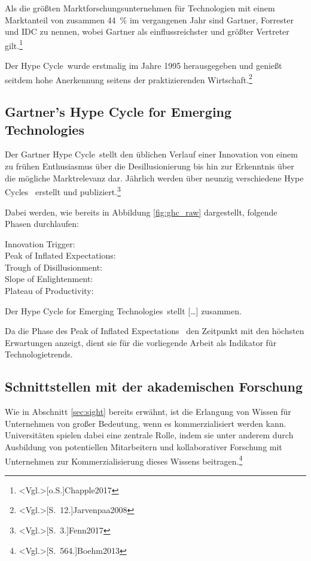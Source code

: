 Als die größten Marktforschungsunternehmen für Technologien mit einem Marktanteil von zusammen 44~\% im vergangenen Jahr sind Gartner, Forrester und IDC zu nennen, wobei Gartner als einflussreichster und größter Vertreter gilt.\footnote{\citeNP<Vgl.>[o.S.]{Chapple2017}}

Der \glqq Hype Cycle\grqq~wurde erstmalig im Jahre 1995 herausgegeben und genießt seitdem hohe Anerkennung seitens der praktizierenden Wirtschaft.\footnote{\citeNP<Vgl.>[S.~12.]{Jarvenpaa2008}}

\subsection{Gartner’s Hype Cycle for Emerging Technologies}
Der \glqq Gartner Hype Cycle\grqq~stellt den üblichen Verlauf einer Innovation von einem zu frühen Enthusiasmus über die Desillusionierung bis hin zur Erkenntnis über die mögliche Marktrelevanz dar. Jährlich werden über neunzig verschiedene \glqq Hype Cycles\grqq~ erstellt und publiziert.\footnote{\citeNP<Vgl.>[S.~3.]{Fenn2017}}

Dabei werden, wie bereits in Abbildung \ref{fig:ghc_raw} dargestellt, folgende Phasen durchlaufen:
\begin{description}
	\item[Innovation Trigger:] 
	\item[Peak of Inflated Expectations:] 
	\item[Trough of Disillusionment:] 
	\item[Slope of Enlightenment:] 
	\item[Plateau of Productivity:] 
\end{description}

Der \glqq Hype Cycle for Emerging Technologies\grqq~stellt [\dots] zusammen.

Da die Phase des \glqq Peak of Inflated Expectations\grqq~ den Zeitpunkt mit den höchsten Erwartungen anzeigt, dient sie für die vorliegende Arbeit als Indikator für Technologietrends.

\subsection{Schnittstellen mit der akademischen Forschung}
Wie in Abschnitt \ref{sec:sight} bereits erwähnt, ist die Erlangung von Wissen für Unternehmen von großer Bedeutung, wenn es kommerzialisiert werden kann. Universitäten spielen dabei eine zentrale Rolle, indem sie unter anderem durch Ausbildung von potentiellen Mitarbeitern und kollaborativer Forschung mit Unternehmen zur Kommerzialisierung dieses Wissens beitragen.\footnote{\citeNP<Vgl.>[S.~564.]{Boehm2013}}


